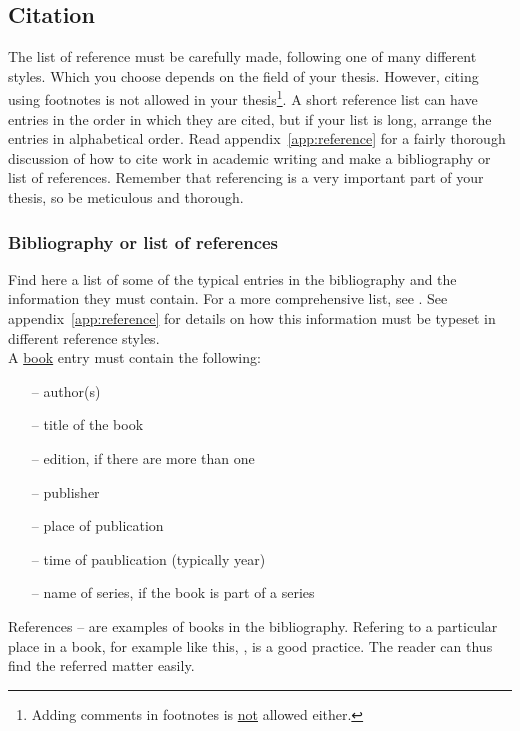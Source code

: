 \documentclass[english, 12pt, a4paper, sci, utf8, a-2b, online]{aaltothesis}
\begin{document}
\subsection{Citation}

The list of reference must be carefully made, following one of many different 
styles. Which you choose depends on the field of your thesis. However, citing 
using footnotes is not allowed in your thesis\footnote{Adding comments in 
footnotes is \underline{not} allowed either.}. A short reference list can have 
entries in the order in which they are cited, but if your list is long, arrange 
the entries in alphabetical order. Read appendix~\ref{app:reference} for a 
fairly thorough discussion of how to cite work in academic writing and make a 
bibliography or list of references. Remember that referencing is a very 
important part of your thesis, so be meticulous and thorough.

\subsubsection{Bibliography or list of references}

Find here a list of some of the typical entries in the bibliography and the 
information they must contain. For a more comprehensive list, see 
\cite{aaltolib}. See appendix~\ref{app:reference} for details on how this 
information must be typeset in different reference styles.\\

\noindent
A \underline{book} entry must contain the following:
\begin{itemize}
\setlength{\itemsep}{-3pt}
\item[--]author(s) 
\item[--]title of the book
\item[--]edition, if there are more than one
\item[--]publisher
\item[--]place of publication
\item[--]time of paublication (typically year)
\item[--]name of series, if the book is part of a series
\end{itemize}
References \cite{Kauranen}--\cite{Koblitz} are examples of books in the 
bibliography. Refering to a particular place in a book, for example like this, 
\cite[s.\ 83--124]{Koblitz}, is a good practice. The reader can thus find the 
referred matter easily.\\
\end{document}
